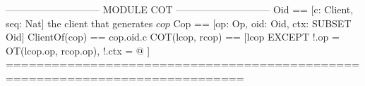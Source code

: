 \documentclass[preview, border={5pt 0pt 5pt 1pt}]{standalone}
\begin{document}
\begin{tla}
----------------------------- MODULE COT -----------------------------
Oid == [c: Client, seq: Nat]                      \* the client that generates $cop$
Cop == [op: Op, oid: Oid, ctx: SUBSET Oid]      ClientOf(cop) == cop.oid.c 
COT(lcop, rcop) ==
    [lcop EXCEPT !.op = OT(lcop.op, rcop.op), !.ctx = @ ]
=============================================================================
\end{tla}
\begin{tlatex}
\@x{}\moduleLeftDash{}\moduleRightDash\@xx{}%
%
%
\@xx{}%
%
\@x{}\bottombar\@xx{}%
\end{tlatex}
\end{document}
